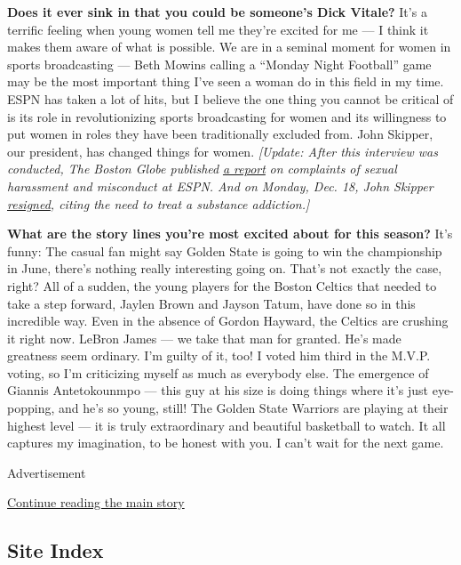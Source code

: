 \textbf{Does it ever sink in that you could be someone's Dick Vitale?}
It's a terrific feeling when young women tell me they're excited for me
--- I think it makes them aware of what is possible. We are in a seminal
moment for women in sports broadcasting --- Beth Mowins calling a
``Monday Night Football'' game may be the most important thing I've seen
a woman do in this field in my time. ESPN has taken a lot of hits, but I
believe the one thing you cannot be critical of is its role in
revolutionizing sports broadcasting for women and its willingness to put
women in roles they have been traditionally excluded from. John Skipper,
our president, has changed things for women. \emph{{[}Update: After this
interview was conducted, The Boston Globe published}
\href{https://www.bostonglobe.com/sports/2017/12/14/women-who-worked-espn-say-its-problems-far-beyond-barstool-sports/L1v9HJIvtnHuBPiMru6yGM/story.html}{\emph{a
report}} \emph{on complaints of sexual harassment and misconduct at
ESPN. And on Monday, Dec. 18, John Skipper}
\href{https://www.nytimes3xbfgragh.onion/2017/12/18/sports/espn-john-skipper-resigns.html}{\emph{resigned}}\emph{,
citing the need to treat a substance addiction.{]}}

\textbf{What are the story lines you're most excited about for this
season?} It's funny: The casual fan might say Golden State is going to
win the championship in June, there's nothing really interesting going
on. That's not exactly the case, right? All of a sudden, the young
players for the Boston Celtics that needed to take a step forward,
Jaylen Brown and Jayson Tatum, have done so in this incredible way. Even
in the absence of Gordon Hayward, the Celtics are crushing it right now.
LeBron James --- we take that man for granted. He's made greatness seem
ordinary. I'm guilty of it, too! I voted him third in the M.V.P. voting,
so I'm criticizing myself as much as everybody else. The emergence of
Giannis Antetokounmpo --- this guy at his size is doing things where
it's just eye-popping, and he's so young, still! The Golden State
Warriors are playing at their highest level --- it is truly
extraordinary and beautiful basketball to watch. It all captures my
imagination, to be honest with you. I can't wait for the next game.

Advertisement

\protect\hyperlink{after-bottom}{Continue reading the main story}

\hypertarget{site-index}{%
\subsection{Site Index}\label{site-index}}


